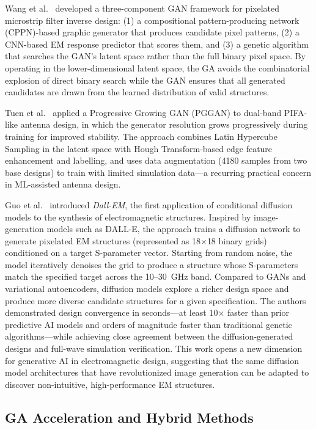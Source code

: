 Wang et al.\ \cite{Wang2025GANCNN} developed a three-component GAN framework for pixelated microstrip filter inverse design: (1) a compositional pattern-producing network (CPPN)-based graphic generator that produces candidate pixel patterns, (2) a CNN-based EM response predictor that scores them, and (3) a genetic algorithm that searches the GAN's latent space rather than the full binary pixel space.  By operating in the lower-dimensional latent space, the GA avoids the combinatorial explosion of direct binary search while the GAN ensures that all generated candidates are drawn from the learned distribution of valid structures.

Tuen et al.\ \cite{Tuen2024PGGAN} applied a Progressive Growing GAN (PGGAN) to dual-band PIFA-like antenna design, in which the generator resolution grows progressively during training for improved stability.  The approach combines Latin Hypercube Sampling in the latent space with Hough Transform-based edge feature enhancement and labelling, and uses data augmentation (4180 samples from two base designs) to train with limited simulation data---a recurring practical concern in ML-assisted antenna design.

Guo et al.\ \cite{Guo2025DallEM} introduced \emph{Dall-EM}, the first application of conditional diffusion models to the synthesis of electromagnetic structures.  Inspired by image-generation models such as DALL-E, the approach trains a diffusion network to generate pixelated EM structures (represented as 18$\times$18 binary grids) conditioned on a target S-parameter vector.  Starting from random noise, the model iteratively denoises the grid to produce a structure whose S-parameters match the specified target across the 10--30~GHz band.  Compared to GANs and variational autoencoders, diffusion models explore a richer design space and produce more diverse candidate structures for a given specification.  The authors demonstrated design convergence in seconds---at least 10$\times$ faster than prior predictive AI models and orders of magnitude faster than traditional genetic algorithms---while achieving close agreement between the diffusion-generated designs and full-wave simulation verification.  This work opens a new dimension for generative AI in electromagnetic design, suggesting that the same diffusion model architectures that have revolutionized image generation can be adapted to discover non-intuitive, high-performance EM structures.

\subsection{GA Acceleration and Hybrid Methods}

